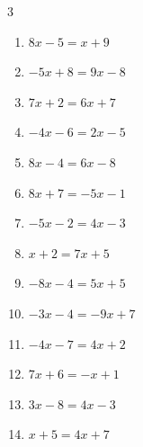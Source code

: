 \begin{multicols}{3}
\begin{enumerate}
  \item $8x-5=x+9$

        \phantom{$\displaystyle x=2$}

  \item $-5x+8=9x-8$


  \item $7x+2=6x+7$

        \phantom{$\displaystyle x=5$}

\columnbreak %

  \item $-4x-6=2x-5$


  \item $8x-4=6x-8$

        \phantom{$\displaystyle x=-2$}

  \item $8x+7=-5x-1$


  \item $-5x-2=4x-3$


  \item $x+2=7x+5$


  \item $-8x-4=5x+5$


  \item $-3x-4=-9x+7$


  \item $-4x-7=4x+2$


  \item $7x+6=-x+1$


  \item $3x-8=4x-3$

        \phantom{$\displaystyle x=-5$}

  \item $x+5=4x+7$


\end{enumerate}
\end{multicols}
